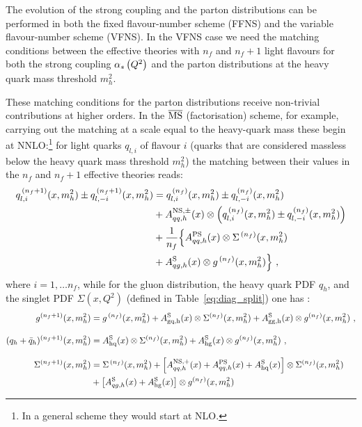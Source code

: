 The evolution of the strong coupling and the parton distributions can
be performed in both the fixed flavour-number scheme (FFNS) and the 
variable flavour-number scheme (VFNS). In the VFNS case we 
need the matching conditions between the effective
theories with $n_f$ and $n_{f}+1$ light flavours for both the strong 
coupling $\alpha_s\left( Q^2 \right)$ and the parton distributions at the heavy quark
mass threshold $m_h^2$.

These matching conditions for the parton distributions
receive non-trivial contributions at higher orders. In the $\overline{\mathrm{MS}}$
(factorisation) scheme, for example,
carrying out the matching at a scale equal to the heavy-quark mass
these begin at NNLO:\footnote{In
  a general scheme they would start at NLO.} %
for light quarks $q_{l,i}$ of flavour $i$ 
(quarks that are considered massless
below the heavy quark mass threshold $m_h^2$) the matching between
their values in the $n_f$ and
$n_f+1$ effective theories reads:
\begin{align}
\label{eq:lp-nf1}
  q_{l,i}^{\,(n_f+1)}(x,m_h^2) \pm q_{l,-i}^{\,(n_f+1)}(x,m_h^2)  & =   q_{l,i}^{\,(n_f)}(x,m_h^2) \pm q_{l,-i}^{\,(n_f)}(x,m_h^2) \notag \\ &+
   A^{\rm NS,\pm}_{qq,h}(x) \otimes \left(
   q_{l,i}^{\, (n_f)}(x,m_h^2) \pm q_{l,-i}^{\, (n_f)}(x,m_h^2)\right) \notag\\
   & + \frac{1}{n_f} \Big\{A^{\rm PS}_{qq,h}(x) \otimes \Sigma^{\, (n_f)}(x,m_h^2) \notag\\
   & + A^{\rm S}_{qg,h}(x) \otimes g^{\, (n_f)}(x,m_h^2)\Big\} \ ,
\end{align}
where $i = 1,\ldots n_f$, while for the gluon distribution, the heavy
quark PDF $q_h$, and the singlet PDF $\Sigma(x,Q^2)$ (defined in
Table~\ref{eq:diag_split}) one has :
\begin{align}
\label{eq:hp-nf1}
  g^{(n_f+1)}(x,m_h^2)  &=
    g^{\, (n_f)}(x,m_h^2) +
    A_{\rm gq,h}^{\rm S}(x) \otimes \Sigma^{(n_f)}(x,m_h^2) +
    A_{\rm gg,h}^{\rm S}(x) \otimes g^{(n_f)}(x,m_h^2) \ ,
  \nonumber \\[0.3cm]
  (q_h+\bar{q}_{h})^{(n_f+1)}(x,m_h^2)  &=
  A_{\rm hq}^{\rm S}(x)\otimes \Sigma^{(n_f)}(x,m_h^2) 
  + A_{\rm hg}^{\rm S}(x)\otimes g^{(n_f)}(x,m_h^2)\ ,  \nonumber \\[0.3cm]
  \Sigma^{(n_f+1)}(x,m_h^2)  &= \Sigma^{\, (n_f)}(x,m_h^2) + \left[ A^{\rm NS,+}_{qq,h}(x) + A^{\rm PS}_{qq,h}(x) + A_{\rm hq}^{\rm S}(x)\right] \otimes \Sigma^{(n_f)}(x,m_h^2) \nonumber \\
  & + \left[ A^{\rm S}_{qg,h}(x) + A_{\rm hg}^{\rm S}(x) \right] \otimes g^{(n_f)}(x,m_h^2)
\end{align}
